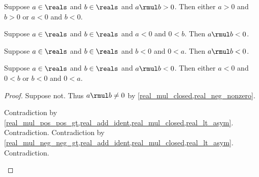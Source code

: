 \begin{proposition}\label{real_mul_pos_same_sign_rev}
    Suppose $a\in\reals$ and $b\in\reals$ and $a \rmul b > 0$.
    Then either $a > 0$ and $b > 0$ or $a < 0$ and $b < 0$.
\end{proposition}

\begin{proposition}\label{real_mul_neg_opposite_sign_left}
    Suppose $a\in\reals$ and $b\in\reals$ and $a < 0$ and $0 < b$.
    Then $a \rmul b < 0$.
\end{proposition}

\begin{proposition}\label{real_mul_neg_opposite_sign_right}
    Suppose $a\in\reals$ and $b\in\reals$ and $b < 0$ and $0 < a$.
    Then $a \rmul b < 0$.
\end{proposition}

\begin{proposition}\label{real_mul_neg_opposite_sign_rev}
    Suppose $a\in\reals$ and $b\in\reals$ and $a \rmul b < 0$.
    Then either $a < 0$ and $0 < b$ or $b < 0$ and $0 < a$.
\end{proposition}
\begin{proof}
    Suppose not.
    Thus $a \rmul b \neq 0$ by \cref{real_mul_closed,real_neg_nonzero}.
    \begin{byCase}
        Contradiction by \cref{real_mul_pos_pos_gt,real_add_ident,real_mul_closed,real_lt_asym}.
        Contradiction.
        Contradiction by \cref{real_mul_neg_neg_gt,real_add_ident,real_mul_closed,real_lt_asym}.
        Contradiction.
    \end{byCase}
\end{proof}

